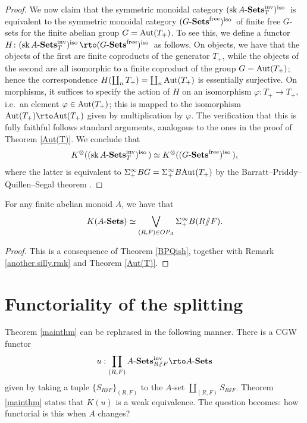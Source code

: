 \documentclass[11pt]{amsart}
\renewcommand{\ss}{\mathord{\sslash}}
\begin{document}
\begin{proof}
We now claim that the symmetric monoidal category $(\operatorname{sk}A\text{-}\mathbf{Sets}^{\mathrm{inv}}_T)^\mathrm{iso}\,$ is equivalent to the symmetric monoidal category $(G\text{-}\mathbf{Sets}^\mathrm{free})^\mathrm{iso}\,$ of finite free $G$-sets for the finite abelian group $G=\mathrm{Aut}(T_+)$. To see this, we define a functor $H\colon (\sk\ASets^\inv_T)^\iso\to (\GSets^\mathrm{free})^\iso$ as follows. On objects, we have that the objects of the first are finite coproducts of the generator $T_+$, while the objects of the second are all isomorphic to a finite coproduct of the group $G=\mathrm{Aut}(T_+)$; hence the correspondence $H(\coprod_n T_+)=\coprod_n \mathrm{Aut}(T_+)$ is essentially surjective. On morphisms, it suffices to specify the action of $H$ on an isomorphism $\varphi\colon T_+\to T_+$, i.e.\ an element $\varphi\in\mathrm{Aut}(T_+)$; this is mapped to the isomorphism $\Aut(T_+)\to \Aut(T_+)$ given by multiplication by $\varphi$. The verification that this is fully faithful follows standard arguments, analogous to the ones in the proof of Theorem \ref{Aut(T)}. We conclude that \[K^\otimes ((\operatorname{sk}A\text{-}\mathbf{Sets}^{\mathrm{inv}}_T)^\mathrm{iso}\,)\simeq K^\otimes((G\text{-}\mathbf{Sets}^\mathrm{free})^\mathrm{iso}\,),\] where the latter is equivalent to $\Sigma_+^\infty BG=\Sigma_+^\infty B\mathrm{Aut}(T_+)$ by the Barratt--Priddy--Quillen--Segal theorem \cite[Proposition 3.6]{segal_coh}.
\end{proof}

\begin{theorem}\label{mainthm}
For any finite abelian monoid $A$, we have that 
      \[K(\ASets) \simeq \bigvee_{\substack{(R,F)\in OP_A}} \Sigma^\infty_+ B(R\ss F).\] %
\end{theorem}
 \begin{proof}
     This is a consequence of Theorem \ref{BPQish}, together with Remark \ref{another.silly.rmk} and Theorem \ref{Aut(T)}. 
 \end{proof}

\section{Functoriality of the splitting}\label{functoriality}

Theorem \ref{mainthm} can be rephrased in the following manner.  There is a CGW functor \[u:\prod_{(R,F)} \ASets^{\inv}_{R \ss F} \rto \ASets\] given by taking a tuple $\{S_{R\ss F}\}_{(R,F)}$ to the $A$-set $\coprod_{(R,F)} S_{R\ss F}$.  Theorem \ref{mainthm} states that $K(u)$ is a weak equivalence.  The question becomes: how functorial is this when $A$ changes?
\end{document}

